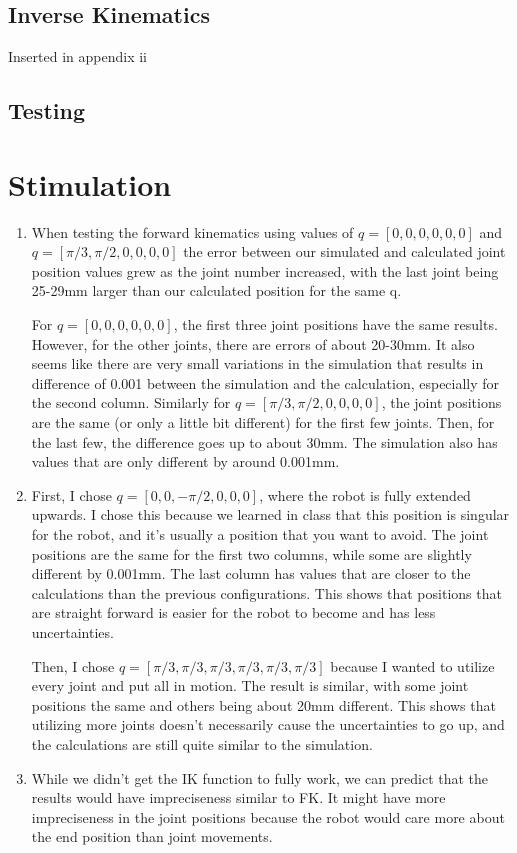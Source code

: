 \documentclass{article}
\begin{document}
\subsection{Inverse Kinematics} 
Inserted in appendix ii 
\subsection{Testing}  

\newpage

\section{Stimulation}

\begin{enumerate}
    \item When testing the forward kinematics using values of $q=[0,0,0,0,0,0]$ and $q=[\pi/3, \pi/2, 0, 0, 0, 0]$ the error between our simulated and calculated joint position values grew as the joint number increased, with the last joint being 25-29mm larger than our calculated position for the same q. 

For $q=[0,0,0,0,0,0]$, the first three joint positions have the same results. However, for the other joints, there are errors of about 20-30mm. It also seems like there are very small variations in the simulation that results in difference of 0.001 between the simulation and the calculation, especially for the second column. Similarly for $q=[\pi/3, \pi/2, 0, 0, 0, 0]$, the joint positions are the same (or only a little bit different) for the first few joints. Then, for the last few, the difference goes up to about 30mm. The simulation also has values that are only different by around 0.001mm.

    \item First, I chose $q=[0,0,-\pi/2,0,0,0]$, where the robot is fully extended upwards. I chose this because we learned in class that this position is singular for the robot, and it's usually a position that you want to avoid. The joint positions are the same for the first two columns, while some are slightly different by 0.001mm. The last column has values that are closer to the calculations than the previous configurations. This shows that positions that are straight forward is easier for the robot to become and has less uncertainties.
    
    Then, I chose $q=[\pi/3,\pi/3,\pi/3,\pi/3,\pi/3,\pi/3]$ because I wanted to utilize every joint and put all in motion. The result is similar, with some joint positions the same and others being about 20mm different. This shows that utilizing more joints doesn't necessarily cause the uncertainties to go up, and the calculations are still quite similar to the simulation.
    
    \item While we didn't get the IK function to fully work, we can predict that the results would have impreciseness similar to FK. It might have more impreciseness in the joint positions because the robot would care more about the end position than joint movements.
\end{enumerate}
\end{document}
